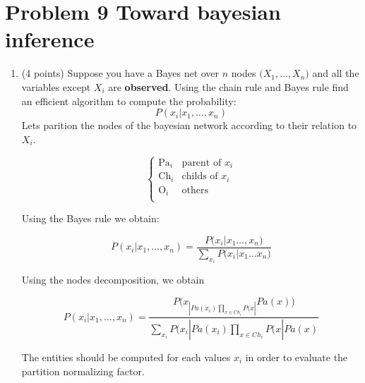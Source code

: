 \documentclass[10pt]{article}
\begin{document}
\section{Problem 9 Toward bayesian inference}%
\label{sec:problem_9_toward_bayesian_inference}
\begin{enumerate}
  \item (4 points) Suppose you have  a Bayes net over $n$ nodes
    $\big(X_1,\ldots,X_n\big)$ and all the variables except $X_i$ are
    \textbf{observed}. Using the chain rule and Bayes rule find an efficient
    algorithm to compute the probability:
    \begin{equation}
      P(x_i|x_1,\ldots, x_n)
    \end{equation}
    Lets parition the nodes of the bayesian network according to their relation
    to $X_i$.

\begin{equation}
  \left\{\begin{array}{ll}
      \text{Pa}_i  & \text{parent of } x_i \\
      \text{Ch}_i & \text{childs of } x_i\\
      \text{O}_i & \text{others}\\
  \end{array}\right.
\end{equation}

Using the Bayes rule we obtain:

\begin{equation}
P(x_i|x_1,\ldots, x_n) = \dfrac{P\big(x_i|x_1\ldots,x_n\big)}{\sum_{x_i} P\big(x_i|x_1\ldots
x_n\big)}
\end{equation}

Using the nodes decomposition, we obtain

\begin{equation}
P(x_i|x_1,\ldots,x_n) = \dfrac{P(x_|Pa(x_i) \prod_{x\in Ch_i} P(x|Pa(x)\big)}
{\sum_{x_i} P(x_i|Pa(x_i) \prod_{x \in Ch_i}P(x|Pa(x)}
\end{equation}

\begin{center}
\end{center}
The entities should be computed for each values $x_i$ in order to evaluate the
partition normalizing factor.


\end{enumerate}
\end{document}
